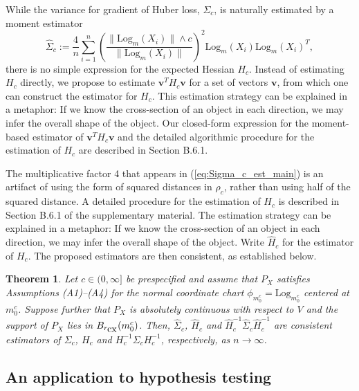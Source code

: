 \documentclass[preprint]{imsart}
\def\vv{\mathbf v}
\theoremstyle{plain}
\newtheorem{theorem}{Theorem}
\theoremstyle{remark}
\begin{document}
While the variance for gradient of Huber loss, $\Sigma_{c}$, is naturally estimated by a moment estimator
\begin{equation}
    \label{eq:Sigma_c_est_main}
    \hat{\Sigma}_{c} := \frac{4}{n}\sum_{i=1}^n \left( \frac{\| \mbox{Log}_{m}(X_i) \| \wedge c}{\| \mbox{Log}_{m}(X_i) \|} \right)^2 \mbox{Log}_{m}(X_i) \mbox{Log}_{m}(X_i)^T,
\end{equation} 
 there is no simple expression for the expected Hessian $H_c$. Instead of estimating $H_c$ directly, we propose to estimate $\vv^T H_c \vv$ for a set of vectors $\vv$, from which one can construct the estimator for $H_c$. This estimation strategy can be explained in a metaphor: If we know the cross-section of an object in each direction, we may infer the overall shape of the object. Our closed-form expression for the moment-based estimator of $
 \vv^T H_c \vv$ and the detailed algorithmic procedure for the estimation of $H_{c}$ are described in Section B.6.1.
 
The multiplicative factor 4 that appears in (\ref{eq:Sigma_c_est_main}) is an artifact of using the form of squared distances in $\rho_c$, rather than using half of the squared distance. A detailed procedure for the estimation of $H_{c}$ is described in Section B.6.1 of the supplementary material. The estimation strategy can be explained in a metaphor: If we know the cross-section of an object in each direction, we may infer the overall shape of the object. 
%
Write  $\hat{H}_c$ for the estimator of $H_c$. The proposed estimators are then consistent, as established below.
 

\begin{theorem} \label{thm:cov:est}
Let $c \in (0, \infty]$ be prespecified and assume that $P_{X}$ satisfies Assumptions (A1)--(A4) for the normal coordinate chart $\phi_{m^{c}_{0}} = \mbox{Log}_{m^{c}_{0}}$ centered at $m^{c}_0$. Suppose further that $P_X$ is absolutely continuous with respect to $V$ and the support of $P_X$ lies in $B_{r_{\mbox{\tiny cx}}}(m^{c}_{0})$. Then, $\hat\Sigma_c$, $\hat{H}_c$ and $\hat{H}_{c}^{-1} \hat\Sigma_{c} \hat{H}_{c}^{-1}$ are consistent estimators of $\Sigma_c$, $H_c$ and $H_{c}^{-1}\Sigma_{c}H_{c}^{-1}$, respectively, as $n \to \infty$.
\end{theorem}
  
 

 


\subsection{An application to hypothesis testing}\label{subsec:application:hypo}
\end{document}
